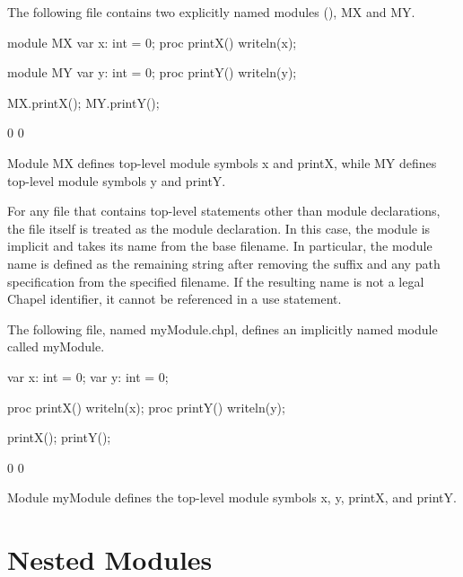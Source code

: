 \begin{example}
The following file contains two explicitly named modules
(), MX and MY.
\begin{chapelpre}
\end{chapelpre}
\begin{chapel}
module MX {
  var x: int = 0;
  proc printX() {
    writeln(x);
  }
}

module MY {
  var y: int = 0;
  proc printY() {
    writeln(y);
  }
}
\end{chapel}
\begin{chapelpost}
MX.printX();
MY.printY();
\end{chapelpost}
\begin{chapeloutput}
0
0
\end{chapeloutput}
Module MX defines top-level module symbols x and printX, while MY
defines top-level module symbols y and printY.
\end{example}

For any file that contains top-level statements other than module
declarations, the file itself is treated as the module declaration.
In this case,
the module is implicit and takes its name from the base filename.  In
particular, the module name is defined as the remaining string after
removing the  suffix and any path specification from the
specified filename.  If the resulting name is not a legal Chapel
identifier, it cannot be referenced in a use statement.

\begin{example}
The following file, named myModule.chpl, defines an implicitly named
module called myModule.
\begin{chapelpre}
\end{chapelpre}
\begin{chapel}
var x: int = 0;
var y: int = 0;

proc printX() {
  writeln(x);
}
proc printY() {
  writeln(y);
}
\end{chapel}
\begin{chapelpost}
printX();
printY();
\end{chapelpost}
\begin{chapeloutput}
0
0
\end{chapeloutput}
Module myModule defines the top-level module symbols x, y, printX, and
printY.
\end{example}


\section{Nested Modules}
\label{Nested_Modules}

